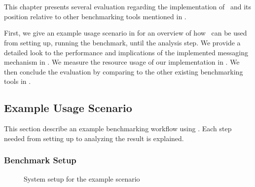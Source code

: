 \fancyhead[LE,RO]{\thepage}

\chapter{\chEvaluation}
\label{ch:evaluation}

This chapter presents several evaluation regarding the implementation of \OurBenchmarkingTool~and its position relative to other benchmarking tools mentioned in .

First, we give an example usage scenario in  for an overview of how \OurBenchmarkingTool~can be used from setting up, running the benchmark, until the analysis step.
We provide a detailed look to the performance and implications of the implemented messaging mechanism in .
We measure the resource usage of our implementation in .
We then conclude the evaluation by comparing \OurBenchmarkingTool to the other existing benchmarking tools in .

\section{Example Usage Scenario}
\label{sec:eval.scenario}

This section describe an example benchmarking workflow using \OurBenchmarkingTool.
Each step needed from setting up to analyzing the result is explained.

\subsection{Benchmark Setup}

\begin{figure}
    \centering
    \caption{System setup for the example scenario}
    \label{fig:eval.setup}
\end{figure}

